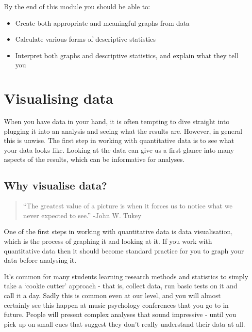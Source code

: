 \documentclass[
]{book}
\providecommand{\tightlist}{%
  \setlength{\itemsep}{0pt}\setlength{\parskip}{0pt}}
\begin{document}
By the end of this module you should be able to:

\begin{itemize}
\tightlist
\item
  Create both appropriate and meaningful graphs from data
\item
  Calculate various forms of descriptive statistics
\item
  Interpret both graphs and descriptive statistics, and explain what they tell you
\end{itemize}

\hypertarget{visualising-data}{%
\section{Visualising data}\label{visualising-data}}

When you have data in your hand, it is often tempting to dive straight into plugging it into an analysis and seeing what the results are. However, in general this is unwise. The first step in working with quantitative data is to see what your data looks like. Looking at the data can give us a first glance into many aspects of the results, which can be informative for analyses.

\hypertarget{why-visualise-data}{%
\subsection{Why visualise data?}\label{why-visualise-data}}

\begin{quote}
``The greatest value of a picture is when it forces us to notice what we never expected to see.'' -John W. Tukey
\end{quote}

One of the first steps in working with quantitative data is data visualisation, which is the process of graphing it and looking at it. If you work with quantitative data then it should become standard practice for you to graph your data before analysing it.

It's common for many students learning research methods and statistics to simply take a `cookie cutter' approach - that is, collect data, run basic tests on it and call it a day. Sadly this is common even at our level, and you will almost certainly see this happen at music psychology conferences that you go to in future. People will present complex analyses that sound impressive - until you pick up on small cues that suggest they don't really understand their data at all.
\end{document}
